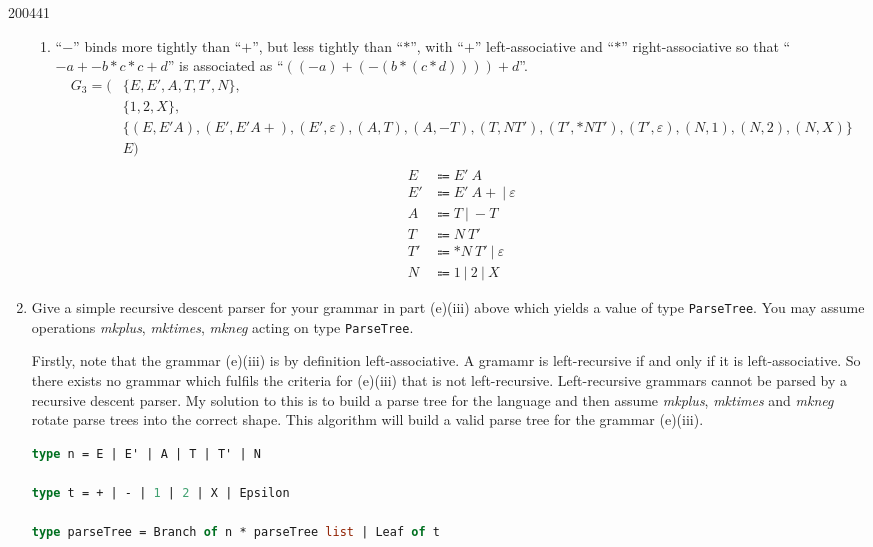 \documentclass[10pt,\jkfside,a4paper]{article}
\begin{document}
\begin{examquestion}{2004}{4}{1}
\begin{enumerate}
\begin{enumerate}
\item ``$-$'' binds more tightly than ``$+$'', but less tightly than
``$*$'', with ``$+$'' left-associative and ``$*$'' right-associative so that
``$-a + -b * c * c + d$'' is associated as ``$((-a) + (-(b * (c * d)))) + d$''.
\[
\begin{split}
G_3 = (&\{E, E', A, T, T', N\}, \\
	   &\{1, 2, X\}, \\
	   &\{(E, E'A), (E', E'A+), (E',\varepsilon), (A, T), (A, -T), (T, NT'),
	    (T', *NT'), (T', \varepsilon), (N, 1), (N, 2), (N, X)\} \\
	   &E) \\
\end{split}
\]
\begin{align*}
E  &\Coloneqq E' \ A \\
E' &\Coloneqq E' \ A + \ | \ \varepsilon \\
A  &\Coloneqq T \ | \ -T \\
T  &\Coloneqq N \ T' \\
T' &\Coloneqq *N \ T' \ | \ \varepsilon \\
N  &\Coloneqq 1 \ | \ 2 \ | \ X
\end{align*}

\end{enumerate}

\item Give a simple recursive descent parser for your grammar in part (e)(iii)
above which yields a value of type \texttt{ParseTree}. You may assume
operations \textit{mkplus}, \textit{mktimes}, \textit{mkneg} acting on type
\texttt{ParseTree}.

Firstly, note that the grammar (e)(iii) is by definition left-associative.
A gramamr is left-recursive if and only if it is left-associative. So there
exists no grammar which fulfils the criteria for (e)(iii) that is not
left-recursive. Left-recursive grammars cannot be parsed by a recursive
descent parser. My solution to this is to build a parse tree for the
language and then assume \textit{mkplus}, \textit{mktimes} and
\textit{mkneg} rotate parse trees into the correct shape. This algorithm
will build a valid parse tree for the grammar (e)(iii).

\begin{lstlisting}[language=Caml]
type n = E | E' | A | T | T' | N

type t = + | - | 1 | 2 | X | Epsilon

type parseTree = Branch of n * parseTree list | Leaf of t


\end{lstlisting}
\end{enumerate}
\end{examquestion}
\end{document}
